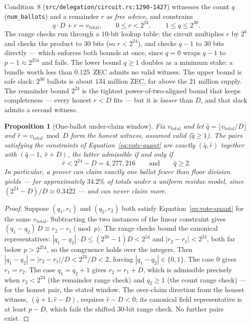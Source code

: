 \documentclass[11pt,a4paper]{article}
\newtheorem{proposition}[theorem]{Proposition}
\theoremstyle{definition}
\begin{document}
Condition~8 (\texttt{src/delegation/circuit.rs:1290-1427}) witnesses the
count $q$ (\texttt{num\_ballots}) and a remainder $r$ as \emph{free
advice}, and constrains
\begin{equation}\label{eq:vote-quant}
q \cdot D + r = v_{\mathrm{total}}, \qquad
0 \le r < 2^{24}, \qquad
1 \le q \le 2^{30}.
\end{equation}
The range checks run through a $10$-bit lookup table: the circuit
multiplies $r$ by $2^{6}$ and checks the product to $30$ bits (so
$r < 2^{24}$), and checks $q - 1$ to $30$ bits directly --- which enforces
both bounds at once, since $q = 0$ wraps $q-1$ to $p - 1 \approx 2^{254}$
and fails. The lower bound $q \ge 1$ doubles as a minimum stake: a bundle
worth less than $0.125$~ZEC admits no valid witness. The upper bound is
safe slack: $2^{30}$ ballots is about $134$ million ZEC, far above the
$21$ million supply. The remainder bound $2^{24}$ is the tightest
power-of-two-aligned bound that keeps completeness --- every honest
$r < D$ fits --- but it is \emph{looser} than $D$, and that slack admits a
second witness.

\begin{proposition}[One-ballot under-claim window]\label{thm:vote-underclaim}
Fix $v_{\mathrm{total}}$ and let
$\hat{q} = \lfloor v_{\mathrm{total}}/D \rfloor$ and
$\hat{r} = v_{\mathrm{total}} \bmod D$ form the honest witness, assumed
valid ($\hat{q} \ge 1$). The pairs satisfying the constraints of
Equation~\eqref{eq:vote-quant} are exactly $(\hat{q}, \hat{r})$ together
with $(\hat{q} - 1,\; \hat{r} + D)$, the latter admissible if and only if
\[
\hat{r} < 2^{24} - D = 4{,}277{,}216
\qquad\text{and}\qquad
\hat{q} \ge 2 .
\]
In particular, a prover can claim exactly one ballot fewer than floor
division yields --- for approximately $34.2\%$ of totals under a uniform
residue model, since $(2^{24} - D)/D \approx 0.3422$ --- and can never
claim more.
\end{proposition}

\begin{proof}
Suppose $(q_1, r_1)$ and $(q_2, r_2)$ both satisfy
Equation~\eqref{eq:vote-quant} for the same $v_{\mathrm{total}}$.
Subtracting the two instances of the linear constraint gives
$(q_1 - q_2)\,D \equiv r_2 - r_1 \pmod{p}$. The range checks bound the
canonical representatives: $|q_1 - q_2| \cdot D \le (2^{30} - 1)D <
2^{54}$ and $|r_2 - r_1| < 2^{24}$, both far below $p > 2^{254}$, so the
congruence holds over the integers. Then
$|q_1 - q_2| = |r_2 - r_1| / D < 2^{24}/D < 2$, forcing
$|q_1 - q_2| \in \{0, 1\}$. The case $0$ gives $r_1 = r_2$. The case
$q_1 = q_2 + 1$ gives $r_2 = r_1 + D$, which is admissible precisely when
$r_2 < 2^{24}$ (the remainder range check) and $q_2 \ge 1$ (the count
range check) --- for the honest pair, the stated window. The over-claim
direction from the honest witness, $(\hat{q} + 1, \hat{r} - D)$, requires
$\hat{r} - D < 0$; its canonical field representative is at least
$p - D$, which fails the shifted $30$-bit range check. No further pairs
exist.
\end{proof}
\end{document}
